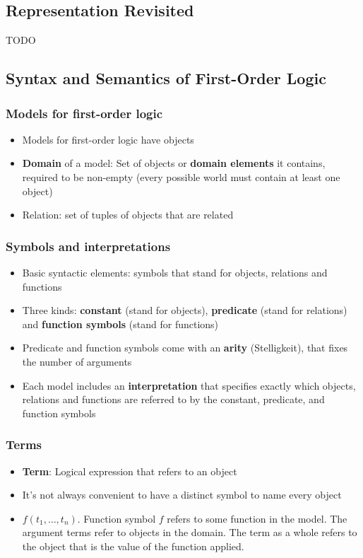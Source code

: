 \documentclass{scrartcl}
\begin{document}
\subsection{Representation Revisited}
    TODO

\subsection{Syntax and Semantics of First-Order Logic}
\subsubsection{Models for first-order logic}
\begin{itemize}
    \item
        Models for first-order logic have objects
    \item
        \textbf{Domain} of a model: Set of objects or \textbf{domain elements} it contains, required to be non-empty (every possible world must contain at least one object)
    \item
        Relation: set of tuples of objects that are related
\end{itemize}

\subsubsection{Symbols and interpretations}
\begin{itemize}
    \item
        Basic syntactic elements: symbols that stand for objects, relations and functions
    \item
        Three kinds: \textbf{constant} (stand for objects), \textbf{predicate} (stand for relations) and \textbf{function symbols} (stand for functions)
    \item
        Predicate and function symbols come with an \textbf{arity} (Stelligkeit), that fixes the number of arguments
    \item
        Each model includes an \textbf{interpretation} that specifies exactly which objects, relations and functions are referred to by the constant, predicate, and function symbols
\end{itemize}

\subsubsection{Terms}
\begin{itemize}
    \item
        \textbf{Term}: Logical expression that refers to an object
    \item
        It's not always convenient to have a distinct symbol to name every object
    \item
        $f(t_1, \dots, t_n)$. Function symbol $f$ refers to some function in the model. The argument terms refer to objects in the domain. The term as a whole refers to the object that is the value of the function applied.
\end{itemize}
\end{document}
